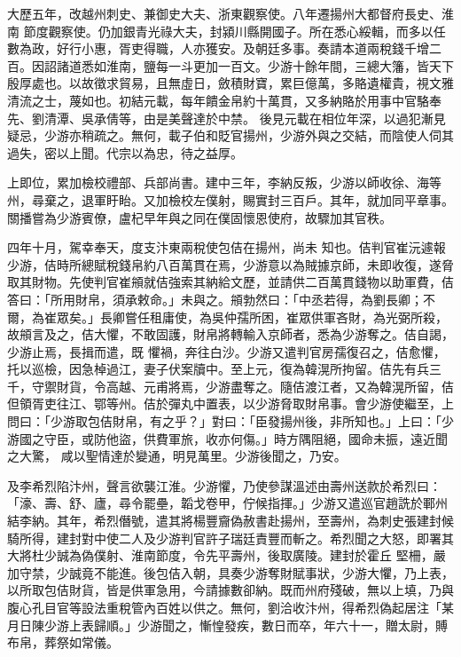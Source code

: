 \begin{pinyinscope}
 大歷五年，改越州刺史、兼御史大夫、浙東觀察使。八年遷揚州大都督府長史、淮南
 節度觀察使。仍加銀青光祿大夫，封潁川縣開國子。所在悉心綏輯，而多以任數為政，好行小惠，胥吏得職，人亦獲安。及朝廷多事。奏請本道兩稅錢千增二百。因詔諸道悉如淮南，鹽每一斗更加一百文。少游十餘年間，三總大籓，皆天下殷厚處也。以故徵求貿易，且無虛日，斂積財寶，累巨億萬，多賂遺權貴，視文雅清流之士，蔑如也。初結元載，每年饋金帛約十萬貫，又多納賂於用事中官駱奉先、劉清潭、吳承倩等，由是美聲達於中禁。
 後見元載在相位年深，以過犯漸見疑忌，少游亦稍疏之。無何，載子伯和貶官揚州，少游外與之交結，而陰使人伺其過失，密以上聞。代宗以為忠，待之益厚。



 上即位，累加檢校禮部、兵部尚書。建中三年，李納反叛，少游以師收徐、海等州，尋棄之，退軍盱眙。又加檢校左僕射，賜實封三百戶。其年，就加同平章事。關播嘗為少游賓僚，盧杞早年與之同在僕固懷恩使府，故驟加其官秩。



 四年十月，駕幸奉天，度支汴東兩稅使包佶在揚州，尚未
 知也。佶判官崔沅遽報少游，佶時所總賦稅錢帛約八百萬貫在焉，少游意以為賊據京師，未即收復，遂脅取其財物。先使判官崔䪻就佶強索其納給文歷，並請供二百萬貫錢物以助軍費，佶答曰：「所用財帛，須承敕命。」未與之。䪻勃然曰：「中丞若得，為劉長卿；不爾，為崔眾矣。」長卿嘗任租庸使，為吳仲孺所困，崔眾供軍吝財，為光弼所殺，故䪻言及之，佶大懼，不敢固護，財帛將轉輸入京師者，悉為少游奪之。佶自謁，少游止焉，長揖而遣，既
 懼禍，奔往白沙。少游又遣判官房孺復召之，佶愈懼，托以巡檢，因急棹過江，妻子伏案牘中。至上元，復為韓滉所拘留。佶先有兵三千，守禦財貨，令高越、元甫將焉，少游盡奪之。隨佶渡江者，又為韓滉所留，佶但領胥吏往江、鄂等州。佶於彈丸中置表，以少游脅取財帛事。會少游使繼至，上問曰：「少游取包佶財帛，有之乎？」對曰：「臣發揚州後，非所知也。」上曰：「少游國之守臣，或防他盜，供費軍旅，收亦何傷。」時方隅阻絕，國命未振，遠近聞之大驚，
 咸以聖情達於變通，明見萬里。少游後聞之，乃安。



 及李希烈陷汴州，聲言欲襲江淮。少游懼，乃使參謀溫述由壽州送款於希烈曰：「濠、壽、舒、廬，尋令罷壘，韜戈卷甲，佇候指揮。」少游又遣巡官趙詵於鄆州結李納。其年，希烈僭號，遣其將楊豐齎偽赦書赴揚州，至壽州，為刺史張建封候騎所得，建封對中使二人及少游判官許子瑞廷責豐而斬之。希烈聞之大怒，即署其大將杜少誠為偽僕射、淮南節度，令先平壽州，後取廣陵。建封於霍丘
 堅柵，嚴加守禁，少誠竟不能進。後包佶入朝，具奏少游奪財賦事狀，少游大懼，乃上表，以所取包佶財貨，皆是供軍急用，今請據數卻納。既而州府殘破，無以上填，乃與腹心孔目官等設法重稅管內百姓以供之。無何，劉洽收汴州，得希烈偽起居注「某月日陳少游上表歸順。」少游聞之，慚惶發疾，數日而卒，年六十一，贈太尉，賻布帛，葬祭如常儀。




\end{pinyinscope}
